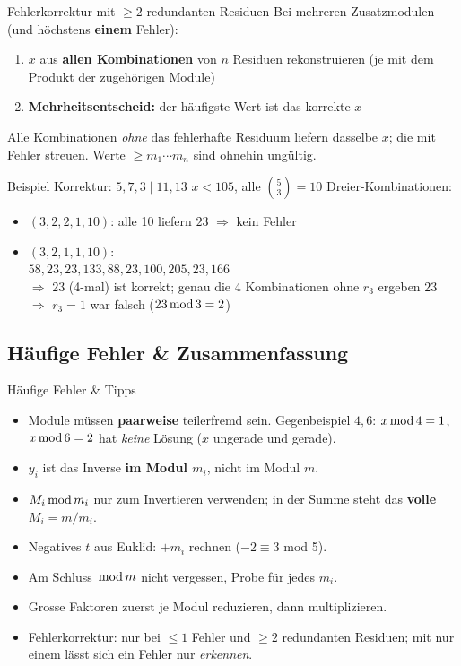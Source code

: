 \documentclass[a4paper, fontsize=7pt]{scrartcl}
\newcommand{\Mod}{\mskip3mu\mathrm{mod}\mskip3mu}
\begin{document}
\begin{mainbox}{Fehlerkorrektur mit $\ge 2$ redundanten Residuen}
Bei mehreren Zusatzmodulen (und höchstens \textbf{einem} Fehler):
\begin{enumerate}
    \item $x$ aus \textbf{allen Kombinationen} von $n$ Residuen
          rekonstruieren (je mit dem Produkt der zugehörigen Module)
    \item \textbf{Mehrheitsentscheid:} der häufigste Wert ist das
          korrekte $x$
\end{enumerate}
Alle Kombinationen \emph{ohne} das fehlerhafte Residuum liefern dasselbe
$x$; die mit Fehler streuen. Werte $\ge m_1 \cdots m_n$ sind ohnehin
ungültig.
\end{mainbox}

\begin{subbox}{Beispiel Korrektur: $5, 7, 3 \mid 11, 13$}
$x < 105$, alle $\binom{5}{3} = 10$ Dreier-Kombinationen:
\begin{itemize}
    \item $(3,2,2,1,10)$: alle 10 liefern $23$ $\Rightarrow$ kein Fehler
    \item $(3,2,1,1,10)$:\\
          $58, 23, 23, 133, 88, 23, 100, 205, 23, 166$\\
          $\Rightarrow$ $23$ (4-mal) ist korrekt; genau die 4 Kombinationen
          ohne $r_3$ ergeben $23$ $\Rightarrow$ $r_3 = 1$ war falsch
          ($23 \Mod 3 = 2$)
\end{itemize}
\end{subbox}

\subsection{Häufige Fehler \& Zusammenfassung}

\begin{subbox}{Häufige Fehler \& Tipps}
\begin{itemize}
    \item Module müssen \textbf{paarweise} teilerfremd sein. Gegenbeispiel
          $4, 6$: $x \Mod 4 = 1$, $x \Mod 6 = 2$ hat \emph{keine} Lösung
          ($x$ ungerade und gerade).
    \item $y_i$ ist das Inverse \textbf{im Modul $m_i$}, nicht im Modul $m$.
    \item $M_i \Mod m_i$ nur zum Invertieren verwenden; in der Summe steht
          das \textbf{volle} $M_i = m/m_i$.
    \item Negatives $t$ aus Euklid: $+m_i$ rechnen ($-2 \equiv 3$ mod 5).
    \item Am Schluss $\Mod m$ nicht vergessen, Probe für jedes $m_i$.
    \item Grosse Faktoren zuerst je Modul reduzieren, dann multiplizieren.
    \item Fehlerkorrektur: nur bei $\le 1$ Fehler und $\ge 2$ redundanten
          Residuen; mit nur einem lässt sich ein Fehler nur
          \emph{erkennen}.
\end{itemize}
\end{subbox}
\end{document}
